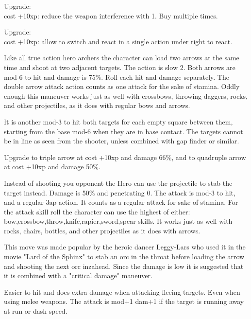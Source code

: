 \noindent
Upgrade:\\
cost +10xp: reduce the weapon interference with 1. Buy multiple times.

\noindent
Upgrade:\\
cost +10xp: allow to switch and react in a single action under right to react.


 Like all true action hero archers the character can load two arrows at the same time and shoot at two adjacent targets. The action is slow 2. Both arrows are mod-6 to hit and damage is 75\%. Roll each hit and damage separately. The double arrow attack action counts as one attack for the sake of stamina.
Oddly enough this maneuver works just as well with crossbows, throwing daggers, rocks, and other projectiles, as it does with regular bows and arrows.

It is another mod-3 to hit both targets for each empty square between them, starting from the base mod-6 when they are in base contact. The targets cannot be in line as seen from the shooter, unless combined with gap finder or similar.

Upgrade to triple arrow at cost +10xp and damage 66\%, and to quadruple arrow at cost +10xp and damage 50\%.


 Instead of shooting you opponent the Hero can use the projectile to stab the target instead. Damage is 50\% and penetrating 0. The attack is mod-3 to hit, and a regular 3ap action. It counts as a regular attack for sake of stamina. For the attack skill roll the character can use the highest of either: bow,crossbow,throw,knife,rapier,sword,spear skills.
It works just as well with rocks, chairs, bottles, and other projectiles as it does with arrows.

This move was made popular by the heroic dancer Leggy-Lars who used it in the movie "Lard of the Sphinx" to stab an orc in the throat before loading the arrow and shooting the next orc inzahead. Since the damage is low it is suggested that it is combined with a "critical damage" maneuver.


 Easier to hit and does extra damage when attacking fleeing targets. Even when using melee weapons. The attack is mod+1 dam+1 if the target is running away at run or dash speed.


